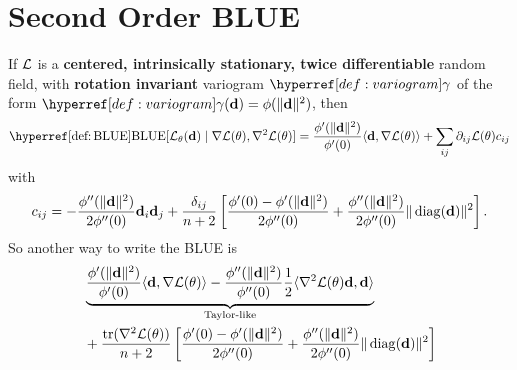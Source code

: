 \section{Second Order BLUE}

\begin{lemma}
	If \(\mathcal{L}\) is a \textbf{centered, intrinsically stationary, twice
	differentiable} random field, with \textbf{rotation invariant} variogram
	\(\variogram\) of the form \(\variogram(\step)=\phi(\|\step\|^2)\), then
	\begin{equation*}
		\BLUE[\Loss_\param(\step)\mid \grad\Loss(\param), \hessian\Loss(\param)]
		= \frac{\phi'(\|\step\|^2)}{\phi'(0)}\langle \step, \grad\Loss(\param)\rangle
		+ \sum_{ij}\partial_{ij}\Loss(\param)c_{ij}
	\end{equation*}
	with
	\begin{equation*}
		c_{ij} =
			- \frac{\phi''(\|\mathbf{d}\|^2)}{2\phi''(0)}\mathbf{d}_i\mathbf{d}_j
			+ \frac{\delta_{ij}}{n+2}\left[
				\frac{\phi'(0) - \phi'(\|\mathbf{d}\|^2)}{2\phi''(0)}
				+ \frac{\phi''(\|\mathbf{d}\|^2)}{2\phi''(0)}\|\operatorname{diag}(\mathbf{d})\|^2
			\right].
	\end{equation*}
	So another way to write the BLUE is
	\begin{equation*}
	\begin{aligned}
		&\underbrace{
			\frac{\phi'(\|\mathbf{d}\|^2)}{\phi'(0)}\langle \mathbf{d}, \nabla\mathcal{L}(\theta)\rangle
			- \frac{\phi''(\|\mathbf{d}\|^2)}{\phi''(0)} \frac12\langle \nabla^2\mathcal{L}(\theta)\mathbf{d}, \mathbf{d}\rangle
		}_{\text{Taylor-like}}\\
		&+ \frac{\operatorname{tr}(\nabla^2 \mathcal{L}(\theta))}{n+2}\left[
				\frac{\phi'(0) - \phi'(\|\mathbf{d}\|^2)}{2\phi''(0)}
				+ \frac{\phi''(\|\mathbf{d}\|^2)}{2\phi''(0)}\|\operatorname{diag}(\mathbf{d})\|^2
		\right]
	\end{aligned}
	\end{equation*}
\end{lemma}

